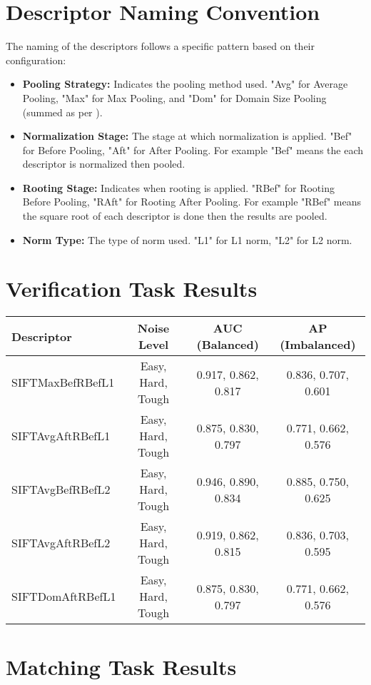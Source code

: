 \section*{Descriptor Naming Convention}

The naming of the descriptors follows a specific pattern based on their configuration:

\begin{itemize}
    \item \textbf{Pooling Strategy:} Indicates the pooling method used. "Avg" for Average Pooling, "Max" for Max Pooling, and "Dom" for Domain Size Pooling (summed as per \cite{dong2015domain}).
    \item \textbf{Normalization Stage:} The stage at which normalization is applied. "Bef" for Before Pooling, "Aft" for After Pooling. For example "Bef" means the each descriptor is normalized then pooled.
    \item \textbf{Rooting Stage:} Indicates when rooting is applied. "RBef" for Rooting Before Pooling, "RAft" for Rooting After Pooling. For example "RBef" means the square root of each descriptor is done then the results are pooled.
    \item \textbf{Norm Type:} The type of norm used. "L1" for L1 norm, "L2" for L2 norm.
\end{itemize}

\section*{Verification Task Results}

\begin{tabular}{lccc}
\toprule
\textbf{Descriptor} & \textbf{Noise Level} & \textbf{AUC (Balanced)} & \textbf{AP (Imbalanced)} \\
\midrule
SIFTMaxBefRBefL1 & Easy, Hard, Tough & 0.917, 0.862, 0.817 & 0.836, 0.707, 0.601 \\
SIFTAvgAftRBefL1 & Easy, Hard, Tough & 0.875, 0.830, 0.797 & 0.771, 0.662, 0.576 \\
SIFTAvgBefRBefL2 & Easy, Hard, Tough & 0.946, 0.890, 0.834 & 0.885, 0.750, 0.625 \\
SIFTAvgAftRBefL2 & Easy, Hard, Tough & 0.919, 0.862, 0.815 & 0.836, 0.703, 0.595 \\
SIFTDomAftRBefL1 & Easy, Hard, Tough & 0.875, 0.830, 0.797 & 0.771, 0.662, 0.576 \\
\bottomrule
\end{tabular}

\section*{Matching Task Results}


